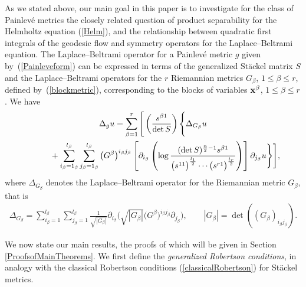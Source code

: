 \documentclass[11pt]{article}
\numberwithin{equation}{section}
\newcommand{\lbeta}{l_{\beta}}
\begin{document}
As we stated above, our main goal in this paper is to investigate for the class of Painlev\'e metrics the closely related question of product separability for the Helmholtz equation (\ref{Helm}), and the relationship between quadratic first integrals of the geodesic flow and symmetry operators for the Laplace--Beltrami equation. The Laplace--Beltrami operator for a Painlev\'e metric $g$ given by~(\ref{Painleveform}) can be expressed in terms of the generalized St\"ackel matrix $S$ and the Laplace--Beltrami operators for the $r$ Riemannian metrics $G_{\beta}$, $1\leq \beta \leq r$, defined by~(\ref{blockmetric}), corresponding to the blocks of variables ${\bf x}^{\beta}$, $1\leq \beta \leq r$. We have
\begin{gather}
\Delta_{g} u =\sum_{\beta=1}^{r}\Bigg[\left(\frac{s^{\beta 1}}{\det S}\right)\Bigg\{\Delta_{G_{\beta}}u\nonumber\\
\hphantom{\Delta_{g} u =}{}+\sum_{i_{\beta}=1_{\beta}}^{l_{\beta}}\sum_{{j}_{\beta}=1_{\beta}}^{l_{\beta}}\big(G^{\beta}\big)^{i_{\beta} j_{\beta}}\left[\partial_{i_{\beta}}\left(\log \frac{(\det S)^{\frac{n}{2}-1}s^{\beta 1}}{\big(s^{11}\big)^{\frac{l_1}{2}} \cdots \big(s^{r1}\big)^{\frac{l_r}{2}}}\right)\right]\partial_{j_{\beta}}u\Bigg\}\Bigg],\label{Laplacian}
\end{gather}
where $\Delta_{G_{\beta}}$ denotes the Laplace--Beltrami operator for the Riemannian metric $G_{\beta}$, that is
\begin{gather*}%
\Delta_{G_{\beta}} = \sum_{i_{\beta}=1}^{\lbeta}\sum_{j_{\beta}=1}^{\lbeta}\frac{1}{\sqrt{|G_{\beta}|}}\partial_{i_{\beta}}\Big(\sqrt{|G_{\beta}|}
\big(G^{\beta}\big)^{i_{\beta}j_{\beta}}\partial_{j_{\beta}}\Big),\qquad |G_{\beta}|=\det((G_{\beta})_{i_{\beta}j_{\beta}}).
\end{gather*}

We now state our main results, the proofs of which will be given in Section \ref{ProofsofMainTheorems}. We first define the \emph{generalized Robertson conditions}, in analogy with the classical Robertson conditions (\ref{classicalRobertson}) for St\"ackel metrics.
\end{document}
